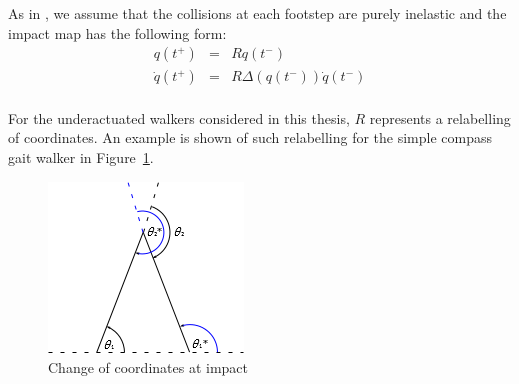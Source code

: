As in \cite{hurmuzlu1994rigid}, we assume that the collisions at each footstep are purely inelastic and the impact map has the following form:
\begin{eqnarray}
	q\left(t^+\right) &=& Rq\left(t^-\right) \label{eqn:impactconfig}\\
	\dot{q}\left(t^+\right) &=& R\Delta\left(q\left(t^-\right)\right)\dot{q}\left(t^-\right) \label{eqn:impactvel}
\end{eqnarray} ~\\

For the underactuated walkers considered in this thesis, $R$ represents a relabelling of coordinates. An example is shown of such relabelling for the simple compass gait walker in Figure~\ref{fig:relabelimpact}.

\begin{figure}[htp]
	\centering
	\includegraphics[scale=1]{3TechBackground/impact.png}
	\caption{Change of coordinates at impact}
	\label{fig:relabelimpact}
\end{figure}

